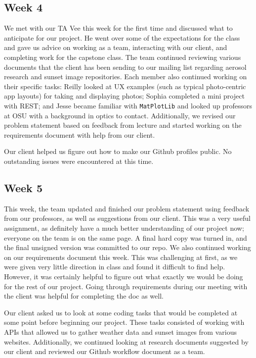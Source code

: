 \documentclass[onecolumn, draftclsnofoot,10pt, compsoc]{IEEEtran}
\begin{document}
\begin{flushleft}
\subsection{Week 4}
We met with our TA Vee this week for the first time and discussed what to anticipate for our project. He went over some of the expectations for the class and gave us advice on working as a team, interacting with our client, and completing work for the capstone class. The team continued reviewing various documents that the client has been sending to our mailing list regarding aerosol research and sunset image repositories. Each member also continued working on their specific tasks: Reilly looked at UX examples (such as typical photo-centric app layouts) for taking and displaying photos; Sophia completed a mini project with REST; and Jesse became familiar with \texttt{MatPlotLib} and looked up professors at OSU with a background in optics to contact. Additionally, we revised our problem statement based on feedback from lecture and started working on the requirements document with help from our client.

\medskip

Our client helped us figure out how to make our Github profiles public. No outstanding issues were encountered at this time.

\subsection{Week 5}
This week, the team updated and finished our problem statement using feedback from our professors, as well as suggestions from our client. This was a very useful assignment, as definitely have a much better understanding of our project now; everyone on the team is on the same page. A final hard copy was turned in, and the final unsigned version was committed to our repo. We also continued working on our requirements document this week. This was challenging at first, as we were given very little direction in class and found it difficult to find help. However, it was certainly helpful to figure out what exactly we would be doing for the rest of our project. Going through requirements during our meeting with the client was helpful for completing the doc as well.

\medskip

Our client asked us to look at some coding tasks that would be completed at some point before beginning our project. These tasks consisted of working with APIs that allowed us to gather weather data and sunset images from various websites. Additionally, we continued looking at research documents suggested by our client and reviewed our Github workflow document as a team.


\end{flushleft}
\end{document}
